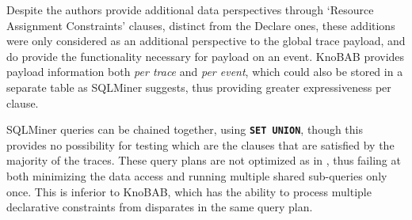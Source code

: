 {Despite the authors } provide additional {data} perspectives through `Resource Assignment Constraints' clauses, distinct from the Declare ones, these additions were only considered as an additional perspective {to the global trace payload}, and do provide the functionality necessary for payload on an event.  KnoBAB provides payload information {both \emph{per trace}} and \emph{per event}, which could also be stored in a separate table as SQLMiner suggests, thus providing greater expressiveness per clause.

SQLMiner queries can be chained together, using \texttt{\textbf{SET UNION}}, though this provides no {possibility for testing which are the clauses that are satisfied by the majority of the traces.} These query plans are not optimized as in \cite{BellatrecheKB21}, thus failing at both minimizing the data access
and running multiple shared sub-queries only once.
This is inferior to KnoBAB, which has the ability to process multiple 
declarative constraints from disparates in the same query plan.
